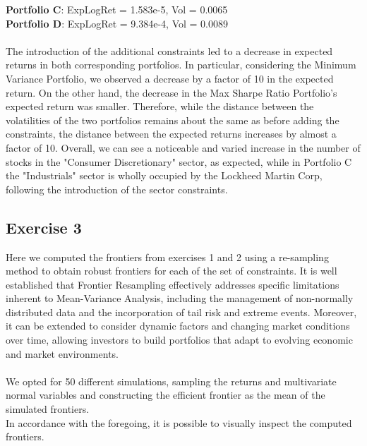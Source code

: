\documentclass{assignment}
\begin{document}
\textbf{Portfolio C}: ExpLogRet = 1.583e-5, Vol = 0.0065\\
\textbf{Portfolio D}: ExpLogRet = 9.384e-4, Vol = 0.0089\\
\\
The introduction of the additional constraints led to a decrease in expected returns in both
corresponding portfolios. 
In particular, considering the Minimum Variance Portfolio, we observed a decrease by a factor of 10
in the expected return. On the other hand, the decrease in the Max Sharpe Ratio Portfolio's
expected return was smaller. 
Therefore, while the distance between the volatilities of the two portfolios remains about the same
as before adding the constraints, the distance between the expected returns increases by almost a
factor of 10. 
Overall, we can see a noticeable and varied increase in the number of stocks in the "Consumer
Discretionary" sector, as expected, while in Portfolio C the "Industrials" sector is wholly
occupied by the Lockheed Martin Corp, following the introduction of the sector constraints.

\subsection*{Exercise 3}
Here we computed the frontiers from exercises 1 and 2 using a re-sampling method to obtain robust
frontiers for each of the set of constraints. It is well established that Frontier Resampling
effectively addresses specific limitations inherent to Mean-Variance Analysis, including the
management of non-normally distributed data and the incorporation of tail risk and extreme events.
Moreover, it can be extended to consider dynamic factors and changing market conditions over time,
allowing investors to build portfolios that adapt to evolving economic and market environments.\\\\
We opted for 50 different simulations, sampling the returns and multivariate normal variables and
constructing the efficient frontier as the mean of the simulated frontiers.\\
In accordance with the foregoing, it is possible to visually inspect the computed frontiers. 
\end{document}
